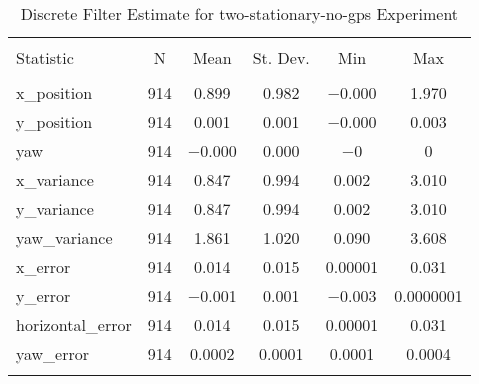 
\begin{table}[h] \centering 
  \caption{Discrete Filter Estimate for two-stationary-no-gps Experiment} 
  \label{tab:two_stationary_no_gps_discrete_summary} 
\begin{tabular}{@{\extracolsep{5pt}}lccccc} 
\\[-1.8ex]\hline 
\hline \\[-1.8ex] 
Statistic & \multicolumn{1}{c}{N} & \multicolumn{1}{c}{Mean} & \multicolumn{1}{c}{St. Dev.} & \multicolumn{1}{c}{Min} & \multicolumn{1}{c}{Max} \\ 
\hline \\[-1.8ex] 
x\_position & 914 & 0.899 & 0.982 & $-$0.000 & 1.970 \\ 
y\_position & 914 & 0.001 & 0.001 & $-$0.000 & 0.003 \\ 
yaw & 914 & $-$0.000 & 0.000 & $-$0 & 0 \\ 
x\_variance & 914 & 0.847 & 0.994 & 0.002 & 3.010 \\ 
y\_variance & 914 & 0.847 & 0.994 & 0.002 & 3.010 \\ 
yaw\_variance & 914 & 1.861 & 1.020 & 0.090 & 3.608 \\ 
x\_error & 914 & 0.014 & 0.015 & 0.00001 & 0.031 \\ 
y\_error & 914 & $-$0.001 & 0.001 & $-$0.003 & 0.0000001 \\ 
horizontal\_error & 914 & 0.014 & 0.015 & 0.00001 & 0.031 \\ 
yaw\_error & 914 & 0.0002 & 0.0001 & 0.0001 & 0.0004 \\ 
\hline \\[-1.8ex] 
\end{tabular} 
\end{table} 
